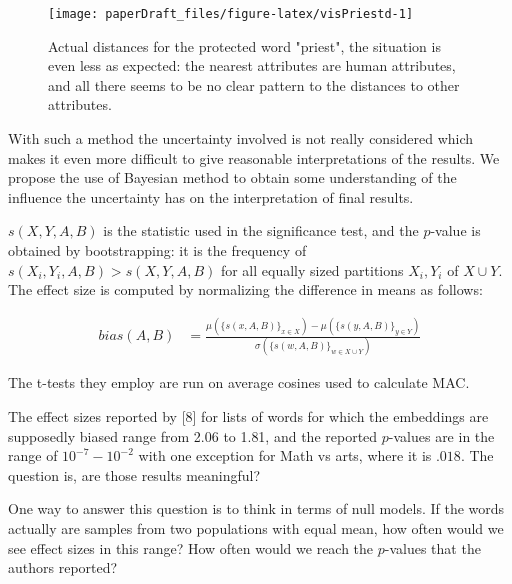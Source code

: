 \documentclass[
  12pt,
  dvipsnames,enabledeprecatedfontcommands]{scrartcl}
\begin{document}
\begin{figure}[H]

\begin{center}\texttt{[image: paperDraft\_files/figure-latex/visPriestd-1]} \end{center}

\caption{Actual distances for the protected word "priest", the situation is even less as expected: the nearest attributes are human attributes, and all there seems to be no clear pattern to the distances to other attributes.}
\label{fig:priest}
\end{figure}

With such a method the uncertainty involved is not really considered
which makes it even more difficult to give reasonable interpretations of
the results. We propose the use of Bayesian method to obtain some
understanding of the influence the uncertainty has on the interpretation
of final results.

\noindent \(s(X,Y,A,B)\) is the statistic used in the significance test,
and the \(p\)-value is obtained by bootstrapping: it is the frequency of
\(s(X_i,Y_i,A,B)>s(X,Y,A,B)\) for all equally sized partitions
\(X_i, Y_i\) of \(X\cup Y\). The effect size is computed by normalizing
the difference in means as follows:

\vspace{-2mm}

\footnotesize

\begin{align}
bias(A,B) & = \frac{
\mu(\{s(x,A,B)\}_{x\in X}) -\mu(\{s(y,A,B)\}_{y\in Y}) 
}{
\sigma(\{s(w,A,B)\}_{w\in X\cup Y})
}
\end{align}

\normalsize

The t-tests they employ are run on average cosines used to calculate
\textsf{MAC}.

The effect sizes reported by {[}8{]} for lists of words for which the
embeddings are supposedly biased range from 2.06 to 1.81, and the
reported \(p\)-values are in the range of \(10^{-7}-10^{-2}\) with one
exception for Math vs arts, where it is \(.018\). The question is, are
those results meaningful?

One way to answer this question is to think in terms of null models. If
the words actually are samples from two populations with equal mean, how
often would we see effect sizes in this range? How often would we reach
the \(p\)-values that the authors reported?
\end{document}
